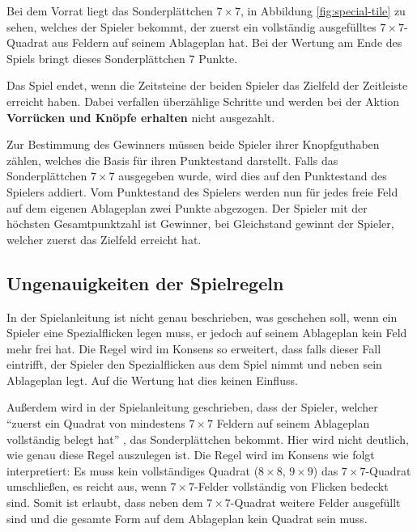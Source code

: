 Bei dem Vorrat liegt das Sonderplättchen $7\times7$, in Abbildung \ref{fig:special-tile} zu sehen, welches der Spieler bekommt, der zuerst ein vollständig ausgefülltes $7\times7$-Quadrat aus Feldern auf seinem Ablageplan hat. Bei der Wertung am Ende des Spiels bringt dieses Sonderplättchen 7 Punkte. \cite{2014.PatchworkSpielanleitung}

Das Spiel endet, wenn die Zeitsteine der beiden Spieler das Zielfeld der Zeitleiste erreicht haben. Dabei verfallen überzählige Schritte und werden bei der Aktion \textbf{Vorrücken und Knöpfe erhalten} nicht ausgezahlt. \cite{2014.PatchworkSpielanleitung}

Zur Bestimmung des Gewinners müssen beide Spieler ihrer Knopfguthaben zählen, welches die Basis für ihren Punktestand darstellt. Falls das Sonderplättchen $7\times7$ ausgegeben wurde, wird dies auf den Punktestand des Spielers addiert. Vom Punktestand des Spielers werden nun für jedes freie Feld auf dem eigenen Ablageplan zwei Punkte abgezogen. Der Spieler mit der höchsten Gesamtpunktzahl ist Gewinner, bei Gleichstand gewinnt der Spieler, welcher zuerst das Zielfeld erreicht hat. \cite{2014.PatchworkSpielanleitung}

\subsection*{Ungenauigkeiten der Spielregeln}

In der Spielanleitung ist nicht genau beschrieben, was geschehen soll, wenn ein Spieler eine Spezialflicken legen muss, er jedoch auf seinem Ablageplan kein Feld mehr frei hat. Die Regel wird im Konsens so erweitert, dass falls dieser Fall eintrifft, der Spieler den Spezialflicken aus dem Spiel nimmt und neben sein Ablageplan legt. Auf die Wertung hat dies keinen Einfluss. \cite{2014.DiscussionSpecialPatch}

Außerdem wird in der Spielanleitung geschrieben, dass der Spieler, welcher \enquote{zuerst ein Quadrat von mindestens $7\times7$ Feldern auf seinem Ablageplan vollständig belegt hat} \cite{2014.PatchworkSpielanleitung}, das Sonderplättchen bekommt. Hier wird nicht deutlich, wie genau diese Regel auszulegen ist. Die Regel wird im Konsens wie folgt interpretiert: Es muss kein vollständiges Quadrat ($8\times8$, $9\times9$) das $7\times7$-Quadrat umschließen, es reicht aus, wenn $7\times7$-Felder vollständig von Flicken bedeckt sind. Somit ist erlaubt, dass neben dem $7\times7$-Quadrat weitere Felder ausgefüllt sind und die gesamte Form auf dem Ablageplan kein Quadrat sein muss. \cite{2014.Discussion7x7}

